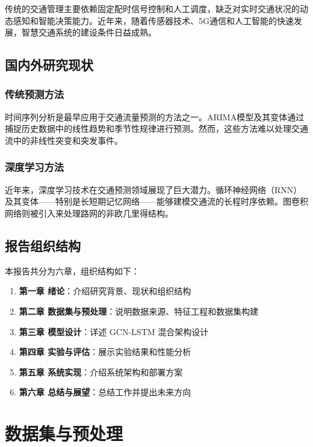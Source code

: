 \documentclass{harryopo-report}
\begin{document}
传统的交通管理主要依赖固定配时信号控制和人工调度，缺乏对实时交通状况的动态感知和智能决策能力。近年来，随着传感器技术、5G通信和人工智能的快速发展，智慧交通系统的建设条件日益成熟。

\section{国内外研究现状}

\subsection{传统预测方法}

时间序列分析是最早应用于交通流量预测的方法之一。ARIMA模型及其变体通过捕捉历史数据中的线性趋势和季节性规律进行预测。然而，这些方法难以处理交通流中的非线性突变和突发事件。

\subsection{深度学习方法}

近年来，深度学习技术在交通预测领域展现了巨大潜力。循环神经网络（RNN）及其变体——特别是长短期记忆网络——能够建模交通流的长程时序依赖。图卷积网络则被引入来处理路网的非欧几里得结构。

\section{报告组织结构}

本报告共分为六章，组织结构如下：

\begin{enumerate}
    \item \textbf{第一章 绪论}：介绍研究背景、现状和组织结构
    \item \textbf{第二章 数据集与预处理}：说明数据来源、特征工程和数据集构建
    \item \textbf{第三章 模型设计}：详述 GCN-LSTM 混合架构设计
    \item \textbf{第四章 实验与评估}：展示实验结果和性能分析
    \item \textbf{第五章 系统实现}：介绍系统架构和部署方案
    \item \textbf{第六章 总结与展望}：总结工作并提出未来方向
\end{enumerate}

\chapter{数据集与预处理}
\end{document}

